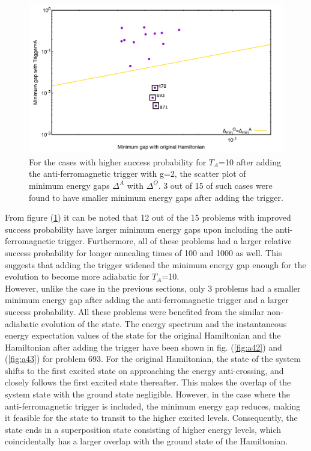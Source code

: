 \documentclass[../main.tex]{subfiles}
\begin{document}
\begin{figure}[H]
\centering 
\includegraphics[scale=0.35]{selected_T10_g2.png}
\caption{For the cases with higher success probability for $T_A$=10 after adding the anti-ferromagnetic trigger with g=2, the scatter plot of minimum energy gaps $\Delta^A $ with $\Delta^O$. 3 out of 15 of such cases were found to have smaller minimum energy gaps after adding the trigger.}
\label{fig:a39}
\end{figure}

From figure (\ref{fig:a39}) it can be noted that 12 out of the 15 problems with improved success probability have larger minimum energy gaps upon including the anti-ferromagnetic trigger. Furthermore, all of these problems had a larger relative success probability for longer annealing times of 100 and 1000 as well. This suggests that adding the trigger widened the minimum energy gap enough for the evolution to become more adiabatic for $T_A$=10.\\

However, unlike the case in the previous sections, only 3  problems had a smaller minimum energy gap after adding the anti-ferromagnetic trigger and a larger success probability. All these problems were benefited from the similar non-adiabatic evolution of the state. The energy spectrum and the instantaneous energy expectation values of the state for the original Hamiltonian and the Hamiltonian after adding the trigger have been shown in fig. (\ref{fig:a42}) and (\ref{fig:a43}) for problem 693. For the original Hamiltonian, the state of the system shifts to the first excited state on approaching the energy anti-crossing, and closely follows the first excited state thereafter. This makes the overlap of the system state with the ground state negligible. However, in the case where the anti-ferromagnetic trigger is included, the minimum energy gap reduces, making it feasible for the state to transit to the higher excited levels. Consequently, the state ends in a superposition state consisting of higher energy levels, which coincidentally has a larger overlap with the ground state of the Hamiltonian.
\end{document}
